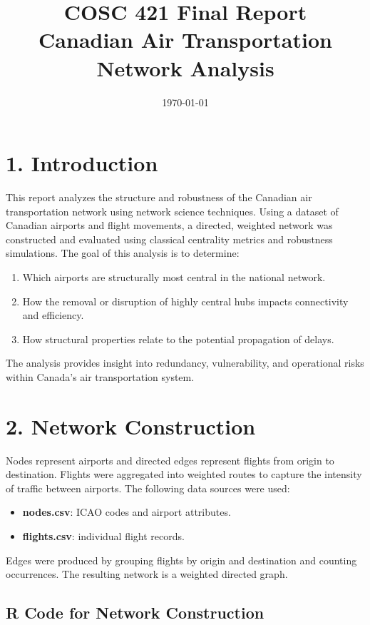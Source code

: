 \documentclass[10pt]{article}
\title{COSC 421 Final Report\\Canadian Air Transportation Network Analysis}
\date{\today}
\begin{document}
\maketitle

\section*{1. Introduction}

This report analyzes the structure and robustness of the Canadian air transportation network using network science techniques. Using a dataset of Canadian airports and flight movements, a directed, weighted network was constructed and evaluated using classical centrality metrics and robustness simulations. The goal of this analysis is to determine:

\begin{enumerate}[label=\arabic*.]
    \item Which airports are structurally most central in the national network.
    \item How the removal or disruption of highly central hubs impacts connectivity and efficiency.
    \item How structural properties relate to the potential propagation of delays.
\end{enumerate}

The analysis provides insight into redundancy, vulnerability, and operational risks within Canada’s air transportation system.

\section*{2. Network Construction}

Nodes represent airports and directed edges represent flights from origin to destination. Flights were aggregated into weighted routes to capture the intensity of traffic between airports. The following data sources were used:

\begin{itemize}
    \item \textbf{nodes.csv}: ICAO codes and airport attributes.
    \item \textbf{flights.csv}: individual flight records.
\end{itemize}

Edges were produced by grouping flights by origin and destination and counting occurrences. The resulting network is a weighted directed graph.

\subsection*{R Code for Network Construction}
\end{document}
